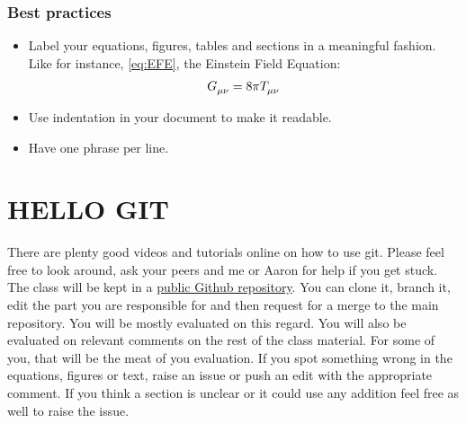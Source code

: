 \documentclass[10pt]{article}
\newcommand{\bs}{\textbackslash}
\begin{document}
               	\section{Best practices}\label{sec:best_prac}
               		\begin{itemize}
    				\item Label your equations, figures, tables and sections in a meaningful fashion. Like for instance, \eqref{eq:EFE}, the Einstein Field Equation:
               				\begin{align}\label{eq:EFE}
                					\tensor{G}{_\mu_\nu}=8 \pi \tensor{T}{_\mu_\nu}
               				\end{align}
    				\item Use indentation in your document to make it readable. 
    				\item Have one phrase per line.
    					\sn{
    						\LaTeX\, don't care.
    						 \LaTeX\, only care about \texttt{\bs \bs}
    						}
    			\end{itemize}
    \newpage
    \part{HELLO GIT}
    	There are plenty good videos and tutorials online on how to use git.
	Please feel free to look around, ask your peers and me or Aaron for help if you get stuck. \\
        The class will be kept in a \href{https://github.com/Majoburo/PHY-387M}{public Github repository}. 
        You can clone it, branch it, edit the part you are responsible for and then request for a merge to the main repository.
        You will be mostly evaluated on this regard. 
        You will also be evaluated on relevant comments on the rest of the class material.
        For some of you, that will be the meat of you evaluation.
        If you spot something wrong in the equations, figures or text, raise an issue or push an edit with the appropriate comment.
        If you think a section is unclear or it could use any addition feel free as well to raise the issue.
\end{document}
